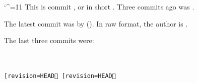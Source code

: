 \catcode`^=11
This is commit \gitcommithash[shortHash=false], or in short \gitcommithash.
Three commits ago was \gitcommithash[revision=HEAD^^^].

The latest commit was by \gitcommitauthorname{} (\gitcommitauthoremail).
In raw format, the author is \texttt{\gitcommitauthor}.

The last three commits were:

{\tt\small
	\gitcommithash{}                \gitcommitmsg                \\
	\gitcommithash[revision=HEAD^]  \gitcommitmsg[revision=HEAD^]\\
	\gitcommithash[revision=HEAD^^] \gitcommitmsg[revision=HEAD^^]}
